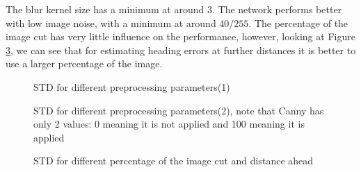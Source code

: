 \documentclass[a4paper,12pt,sort&compress]{article}
\begin{document}
    The blur kernel size has a minimum at around $\num{3}$. The network performs better with low
    image noise, with a minimum at around $40 / 255$. The percentage of the image cut has very
    little influence on the performance, however, looking at Figure
    \ref{fig:3d_keep_bottom_he_dist}, we can see that for estimating heading errors at further
    distances it is better to use a larger percentage of the image.

    \begin{figure}
        \centering
        \begin{subfigure}[b]{\textwidth}
            \centering
        \end{subfigure}
        \begin{subfigure}[b]{\textwidth}
            \centering
        \end{subfigure}
        \caption{STD for different preprocessing parameters(1)}
        \label{fig:preprocessing_params1}
    \end{figure}

    \begin{figure}
        \centering
        \begin{subfigure}[b]{\textwidth}
            \centering
        \end{subfigure}
        \begin{subfigure}[b]{\textwidth}
            \centering
        \end{subfigure}
        \caption{STD for different preprocessing parameters(2), note that Canny has only 2 values: 0 meaning it is not applied and 100 meaning it is applied}
        \label{fig:preprocessing_params2}
    \end{figure}


    \begin{figure}
        \centering
        \caption{STD for different percentage of the image cut and distance ahead}
        \label{fig:3d_keep_bottom_he_dist}
    \end{figure}
\end{document}
